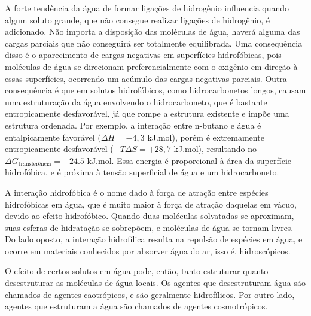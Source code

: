 	A forte tendência da água de formar ligações de hidrogênio influencia quando algum soluto grande, que não consegue realizar ligações de hidrogênio, é adicionado. Não importa a disposição das moléculas de água, haverá alguma das cargas parciais que não conseguirá ser totalmente equilibrada. Uma consequência disso é o aparecimento de cargas negativas em superfícies hidrofóbicas, pois moléculas de água se direcionam preferencialmente com o oxigênio em direção à essas superfícies, ocorrendo um acúmulo das cargas negativas parciais. Outra consequência é que em solutos hidrofóbicos, como hidrocarbonetos longos, causam uma estruturação da água envolvendo o hidrocarboneto, que é bastante entropicamente desfavorável, já que rompe a estrutura existente e impõe uma estrutura ordenada. Por exemplo, a interação entre n-butano e água é entalpicamente favorável (\(\Delta H = -4,3\) kJ.mol\menosUm), porém é extremamente entropicamente desfavorável (\(-T\Delta S = +28,7\) kJ.mol\menosUm), resultando no \(\Delta G_{\mathrm{transferência}} = +24.5\) kJ.mol\menosUm. Essa energia é proporcional à área da superfície hidrofóbica, e é próxima à tensão superficial de água e um hidrocarboneto. 
	
	A interação hidrofóbica é o nome dado à força de atração entre espécies hidrofóbicas em água, que é muito maior à força de atração daquelas em vácuo, devido ao efeito hidrofóbico. Quando duas moléculas solvatadas se aproximam, suas esferas de hidratação se sobrepõem, e moléculas de água se tornam livres. Do lado oposto, a interação hidrofílica resulta na repulsão de espécies em água, e ocorre em materiais conhecidos por absorver água do ar, isso é, hidroscópicos.
	
	O efeito de certos solutos em água pode, então, tanto estruturar quanto desestruturar as moléculas de água locais. Os agentes que desestruturam água são chamados de agentes caotrópicos, e são geralmente hidrofílicos. Por outro lado, agentes que estruturam a água são chamados de agentes cosmotrópicos. %
	   
	
	
